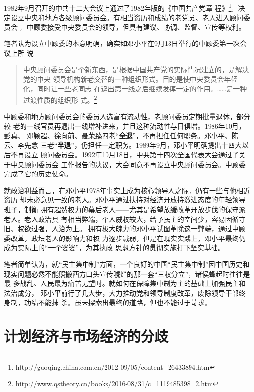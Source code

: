 1982年9月召开的中共十二大会议上通过了1982年版的《中国共产党章
程》\footnote{\url{http://guoqing.china.com.cn/2012-09/05/content_26433894.htm}}，决
定设立中央和地方各级顾问委员会。有相当资历和成绩的老党员、老人进入顾问委员会；
中顾委接受中央委员会的领导，但具有建议、协调、监督、宣传等权利。

笔者认为设立中顾委的本意明确，确实如邓小平在9月13日举行的中顾委第一次会议上所
说
\begin{quotation}
  中央顾问委员会是个新东西，是根据中国共产党的实际情况建立的，是解决党的中央
  领导机构新老交替的一种组织形式。目的是使中央委员会年轻化，同时让一些老同志
  在退出第一线之后继续发挥一定的作用。……是一种过渡性质的组织形
  式。\footnote{\url{http://www.qstheory.cn/books/2016-08/31/c_1119485398_2.htm}}
\end{quotation}

中顾委和地方顾问委员会的委员人选富有流动性，老顾问委员定期批量退休，部分较
老的一线官员再退出一线增补进来，并且这种流动性与日俱增。1986年10月，彭真、
邓颖超、徐向前、聂荣臻四老“\textbf{全退}”，不再担任任何职务。邓小平、陈云、李先念
三老“\textbf{半退}”，仍担任一定职务。1989年9月，邓小平明确提出十四大以后不再设立
顾问委员会。1992年10月18日，中共第十四次全国代表大会通过了关于中央顾问委员会
工作报告的决议，大会同意不再设立中央顾问委员会。中顾委完成了它的历史使命。

就政治利益而言，在邓小平1978年事实上成为核心领导人之际，仍有一些与他相近资历
却未必意见一致的老人。邓小平通过扶持对经济开放持激进态度的年轻领导班子，制衡
拥有超然权力的幕后老人——尤其是希望放缓改革开放步伐的保守派老人。老人政治具
有相当弊端，个人威权较大，给予民主的空间少，容易因循守旧、权欲过强，人治为上。
拥有极大魄力的邓小平试图革除这一弊端，通过中顾委改革，政坛老人的影响力和权
力逐步减弱，但是在现实实践上，邓小平最终仍成为实际上的“一个婆婆”，为其执政
思想方针的贯彻实施打下坚实基础。


笔者简单认为，就“民主集中制”方面，一个良好的中国“民主集中制”因中国历史和
现实问题必然不能照搬西方口头宣传唬烂的那一套“三权分立”，诸侯蜂起时往往是最
多战乱、人民最为痛苦无望时。就如何在保障集中制为主的基础上加强民主和法治成分，
邓小平前行了几大步，大力推动党和领导制度改革，废除领导干部终身制，功绩不能抹
杀。虽未探索出最终的道路，但也不能过于苛求。

\section{计划经济与市场经济的分歧}


